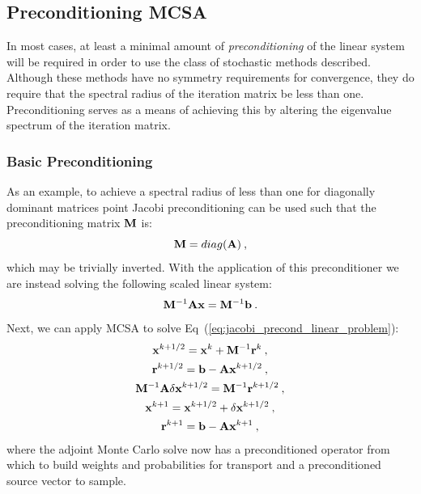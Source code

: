 \subsection{Preconditioning MCSA}
\label{subsec:stochastic_preconditioning}
In most cases, at least a minimal amount of \textit{preconditioning}
of the linear system will be required in order to use the class of
stochastic methods described. Although these methods have no symmetry
requirements for convergence, they do require that the spectral radius
of the iteration matrix be less than one. Preconditioning serves as a
means of achieving this by altering the eigenvalue spectrum of the
iteration matrix.

\subsubsection{Basic Preconditioning}
\label{subsubsec:basic_mcsa_preconditioning}
As an example, to achieve a spectral radius of less than one for
diagonally dominant matrices point Jacobi preconditioning can be used
such that the preconditioning matrix $\mathbf{M}$ is:
\begin{equation}
  \mathbf{M} = diag(\mathbf{A})\:,
  \label{eq:jacobi_preconditioner}
\end{equation}
which may be trivially inverted. With the application of this
preconditioner we are instead solving the following scaled linear
system:
\begin{equation}
  \mathbf{M}^{-1}\mathbf{A}\mathbf{x} = \mathbf{M}^{-1}\mathbf{b}\:.
  \label{eq:jacobi_precond_linear_problem}
\end{equation}
Next, we can apply MCSA to solve
Eq~(\ref{eq:jacobi_precond_linear_problem}): 
\begin{subequations}
  \begin{gather}
    \mathbf{x}^{k+1/2} = \mathbf{x}^k +
    \mathbf{M}^{-1}\mathbf{r}^k\:,\\ \mathbf{r}^{k+1/2} =
    \mathbf{b}-\mathbf{A}\mathbf{x}^{k+1/2}\:,\\ \mathbf{M}^{-1}\mathbf{A}\delta\mathbf{x}^{k+1/2}
    = \mathbf{M}^{-1}\mathbf{r}^{k+1/2}\:,\\ \mathbf{x}^{k+1} = \mathbf{x}^{k+1/2} +
    \delta \mathbf{x}^{k+1/2}\:,\\
    \mathbf{r}^{k+1} = \mathbf{b} - \mathbf{A}\mathbf{x}^{k+1}\:,
    \label{eq:jacobi_preconditioned_mcsa}
  \end{gather}
\end{subequations}
where the adjoint Monte Carlo solve now has a preconditioned operator
from which to build weights and probabilities for transport and a
preconditioned source vector to sample. 

